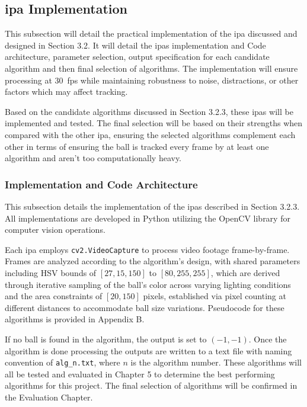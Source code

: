\documentclass[12pt,a4paper]{article}
\begin{document}
\subsection{\acs{ipa} Implementation}
This subsection will detail the practical implementation of the \acs{ipa} discussed and designed in Section 3.2. It will detail the \acs{ipa}s implementation and Code architecture, parameter selection, output specification for each candidate algorithm and then final selection of algorithms. The implementation will ensure processing at 30~\acs{fps} while maintaining robustness to noise, distractions, or other factors which may affect tracking.

Based on the candidate algorithms discussed in Section 3.2.3, these \acs{ipa}s will be implemented and tested. The final selection will be based on their strengths when compared with the other \acs{ipa}, ensuring the selected algorithms complement each other in terms of ensuring the ball is tracked every frame by at least one algorithm and aren't too computationally heavy.

\subsubsection{Implementation and Code Architecture}
This subsection details the implementation of the \acs{ipa}s described in Section 3.2.3. All implementations are developed in Python utilizing the OpenCV library \parencite{opencv_library} for computer vision operations.

Each \acs{ipa} employs \texttt{cv2.VideoCapture} to process video footage frame-by-frame. Frames are analyzed according to the algorithm's design, with shared parameters including HSV bounds of $[27, 15, 150]$ to $[80, 255, 255]$, which are derived through iterative sampling of the ball's color across varying lighting conditions and the area constraints of $[20, 150]$ pixels, established via pixel counting at different distances to accommodate ball size variations. Pseudocode for these algorithms is provided in Appendix B.

If no ball is found in the algorithm, the output is set to $(-1,-1)$. Once the algorithm is done processing the outputs are written to a text file with naming convention of \texttt{alg\_n.txt}, where $n$ is the algorithm number. These algorithms will all be tested and evaluated in Chapter 5 to determine the best performing algorithms for this project. The final selection of algorithms will be confirmed in the Evaluation Chapter.
\end{document}
